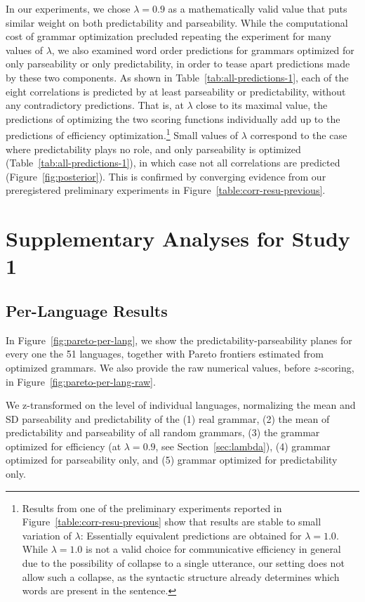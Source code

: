 \documentclass[10pt,twoside,lineno]{article}
\begin{document}
In our experiments, we chose $\lambda = 0.9$ as a mathematically valid value that puts similar weight on both predictability and parseability.
While the computational cost of grammar optimization precluded repeating the experiment for many values of $\lambda$, we also examined word order predictions for grammars optimized for only parseability or only predictability, in order to tease apart predictions made by these two components.
As shown in Table~\ref{tab:all-predictions-1}, each of the eight correlations is predicted by at least parseability or predictability, without any contradictory predictions.
That is, at $\lambda$ close to its maximal value, the predictions of optimizing the two scoring functions individually add up to the predictions of efficiency optimization.\footnote{Results from one of the preliminary experiments reported in Figure~\ref{table:corr-resu-previous} show that results are stable to small variation of $\lambda$: Essentially equivalent predictions are obtained for $\lambda=1.0$. While $\lambda=1.0$ is not a valid choice for communicative efficiency in general due to the possibility of collapse to a single utterance, our setting does not allow such a collapse, as the syntactic structure already determines which words are present in the sentence.}
Small values of $\lambda$ correspond to the case where predictability plays no role, and only parseability is optimized (Table~\ref{tab:all-predictions-1}), in which case not all correlations are predicted (Figure~\ref{fig:posterior}).
This is confirmed by converging evidence from our preregistered preliminary experiments in Figure~\ref{table:corr-resu-previous}.






\section{Supplementary Analyses for Study 1}

\subsection{Per-Language Results}
In Figure~\ref{fig:pareto-per-lang}, we show the predictability-parseability planes for every one the 51 languages, together with Pareto frontiers estimated from optimized grammars.
We also provide the raw numerical values, before $z$-scoring, in Figure~\ref{fig:pareto-per-lang-raw}.


We z-transformed on the level of individual languages, normalizing the mean and SD parseability and predictability of the (1) real grammar, (2) the mean of predictability and parseability of all random grammars, (3) the grammar optimized for efficiency (at $\lambda =0.9$, see Section~\ref{sec:lambda}), (4) grammar optimized for parseability only, and (5) grammar optimized for predictability only.
\end{document}
